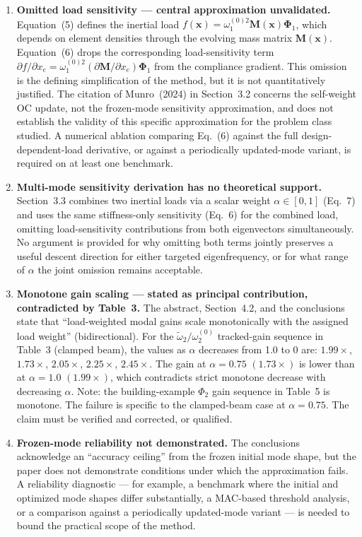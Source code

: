 \documentclass[11pt,a4paper]{article}
\begin{document}
\begin{enumerate}[leftmargin=*, label=\textbf{C\arabic*.}]

\item \textbf{Omitted load sensitivity --- central approximation unvalidated.}
Equation~(5) defines the inertial load $f(\mathbf{x}) =
\omega_1^{(0)2}\mathbf{M}(\mathbf{x})\boldsymbol{\Phi}_1$, which depends on
element densities through the evolving mass matrix $\mathbf{M}(\mathbf{x})$.
Equation~(6) drops the corresponding load-sensitivity term
$\partial f / \partial x_e = \omega_1^{(0)2}(\partial \mathbf{M}/\partial x_e)
\boldsymbol{\Phi}_1$ from the compliance gradient.
This omission is the defining simplification of the method, but it is
not quantitatively justified. The citation of Munro~(2024) in
Section~3.2 concerns the self-weight OC update, not the frozen-mode
sensitivity approximation, and does not establish the validity of this
specific approximation for the problem class studied.
A numerical ablation comparing Eq.~(6) against the full
design-dependent-load derivative, or against a periodically
updated-mode variant, is required on at least one benchmark.

\item \textbf{Multi-mode sensitivity derivation has no theoretical support.}
Section~3.3 combines two inertial loads via a scalar weight
$\alpha \in [0,1]$ (Eq.~7) and uses the same stiffness-only
sensitivity (Eq.~6) for the combined load, omitting load-sensitivity
contributions from both eigenvectors simultaneously.
No argument is provided for why omitting both terms jointly preserves a
useful descent direction for either targeted eigenfrequency, or for what
range of $\alpha$ the joint omission remains acceptable.

\item \textbf{Monotone gain scaling --- stated as principal contribution,
contradicted by Table~3.}
The abstract, Section~4.2, and the conclusions state that
``load-weighted modal gains scale monotonically with the assigned load
weight'' (bidirectional). For the $\widetilde{\omega}_2/\omega_2^{(0)}$
tracked-gain sequence in Table~3 (clamped beam), the values as
$\alpha$ decreases from 1.0 to 0 are: $1.99\times$, $1.73\times$,
$2.05\times$, $2.25\times$, $2.45\times$. The gain at $\alpha=0.75$
$(1.73\times)$ is lower than at $\alpha=1.0$ $(1.99\times)$, which
contradicts strict monotone decrease with decreasing $\alpha$.
Note: the building-example $\Phi_2$ gain sequence in Table~5 is
monotone. The failure is specific to the clamped-beam case at
$\alpha=0.75$. The claim must be verified and corrected, or qualified.

\item \textbf{Frozen-mode reliability not demonstrated.}
The conclusions acknowledge an ``accuracy ceiling'' from the frozen
initial mode shape, but the paper does not demonstrate conditions under
which the approximation fails. A reliability diagnostic --- for example,
a benchmark where the initial and optimized mode shapes differ
substantially, a MAC-based threshold analysis, or a comparison against
a periodically updated-mode variant --- is needed to bound the practical
scope of the method.

\end{enumerate}
\end{document}

